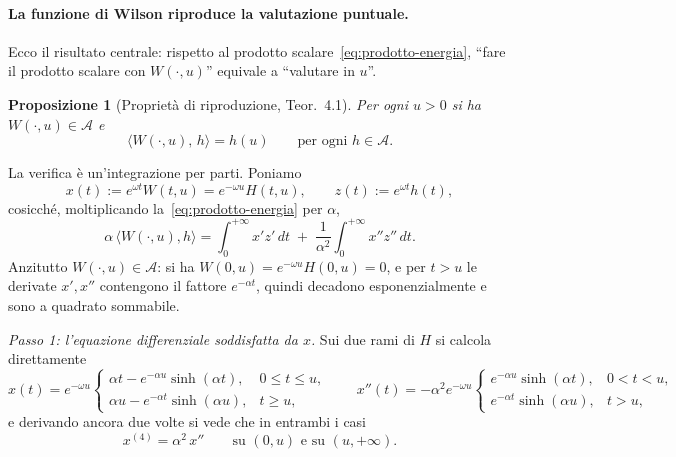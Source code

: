 \documentclass[11pt,a4paper]{article}
\theoremstyle{plain}
\newtheorem{proposizione}[teorema]{Proposizione}
\theoremstyle{definition}
\theoremstyle{remark}
\begin{document}
\paragraph{La funzione di Wilson riproduce la valutazione puntuale.}
Ecco il risultato centrale: rispetto al prodotto scalare~\eqref{eq:prodotto-energia}, ``fare
il prodotto scalare con $W(\cdot,u)$'' equivale a ``valutare in $u$''.

\begin{proposizione}[Propriet\`a di riproduzione, \cite{gach2017} Teor.~4.1]
\label{prop:W-repr}
Per ogni $u>0$ si ha $W(\cdot,u)\in\mathcal{A}$ e
\begin{equation}
  \bigl\langle W(\cdot,u),\,h \bigr\rangle = h(u)
  \qquad\text{per ogni } h\in\mathcal{A}.
  \label{eq:riproduzione}
\end{equation}
\end{proposizione}

La verifica \`e un'integrazione per parti. Poniamo
\[
  x(t) := e^{\omega t}W(t,u) = e^{-\omega u}H(t,u),
  \qquad
  z(t) := e^{\omega t}h(t),
\]
cosicch\'e, moltiplicando la~\eqref{eq:prodotto-energia} per $\alpha$,
\begin{equation}
  \alpha\,\bigl\langle W(\cdot,u),h \bigr\rangle
  = \int_0^{+\infty}\! x'z'\,dt \;+\; \frac{1}{\alpha^{2}}\int_0^{+\infty}\! x''z''\,dt .
  \label{eq:repr-start}
\end{equation}
Anzitutto $W(\cdot,u)\in\mathcal{A}$: si ha $W(0,u)=e^{-\omega u}H(0,u)=0$, e per $t>u$ le
derivate $x',x''$ contengono il fattore $e^{-\alpha t}$, quindi decadono esponenzialmente e
sono a quadrato sommabile.

\emph{Passo 1: l'equazione differenziale soddisfatta da $x$.} Sui due rami di $H$ si calcola
direttamente
\[
  x(t) = e^{-\omega u}\!\begin{cases}
    \alpha t - e^{-\alpha u}\sinh(\alpha t), & 0\le t\le u,\\[2pt]
    \alpha u - e^{-\alpha t}\sinh(\alpha u), & t\ge u,
  \end{cases}
  \qquad
  x''(t) = -\alpha^{2}e^{-\omega u}\!\begin{cases}
    e^{-\alpha u}\sinh(\alpha t), & 0<t<u,\\[2pt]
    e^{-\alpha t}\sinh(\alpha u), & t>u,
  \end{cases}
\]
e derivando ancora due volte si vede che in entrambi i casi
\begin{equation}
  x^{(4)} = \alpha^{2}\,x'' \qquad\text{su } (0,u) \text{ e su } (u,+\infty).
  \label{eq:ode-x}
\end{equation}
\end{document}
